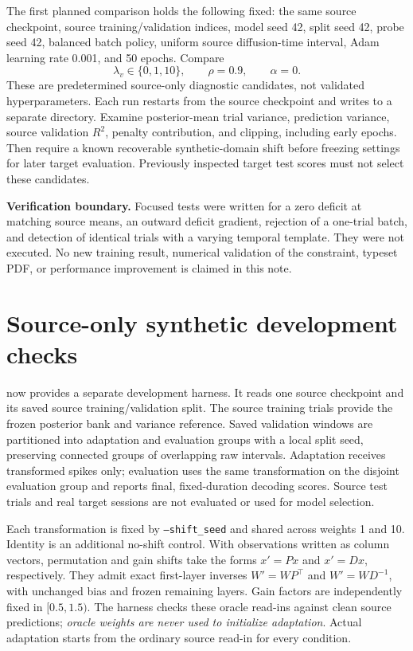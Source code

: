 \documentclass[11pt,a4paper]{article}
\begin{document}
The first planned comparison holds the following fixed: the same source
checkpoint, source training/validation indices, model seed 42, split seed 42,
probe seed 42, balanced batch policy, uniform source diffusion-time interval,
Adam learning rate 0.001, and 50 epochs. Compare
\begin{equation}
 \lambda_v\in\{0,1,10\},\qquad\rho=0.9,\qquad\alpha=0.
\end{equation}
These are predetermined source-only diagnostic candidates, not validated
hyperparameters. Each run restarts from the source checkpoint and writes to
a separate directory. Examine posterior-mean trial variance, prediction
variance, source validation $R^2$, penalty contribution, and clipping, including
early epochs. Then require a known recoverable synthetic-domain shift before
freezing settings for later target evaluation. Previously inspected target
test scores must not select these candidates.

\textbf{Verification boundary.} Focused tests were written for a zero deficit
at matching source means, an outward deficit gradient, rejection of a one-trial
batch, and detection of identical trials with a varying temporal template.
They were not executed. No new training result, numerical validation of the
constraint, typeset PDF, or performance improvement is claimed in this note.

\section{Source-only synthetic development checks}

 now provides a separate development harness.
It reads one source checkpoint and its saved source training/validation split.
The source training trials provide the frozen posterior bank and variance
reference. Saved validation windows are partitioned into adaptation and
evaluation groups with a local split seed, preserving connected groups of
overlapping raw intervals. Adaptation receives transformed spikes only;
evaluation uses the same transformation on the disjoint evaluation group and
reports final, fixed-duration decoding scores. Source test trials and real
target sessions are not evaluated or used for model selection.

Each transformation is fixed by \texttt{--shift\_seed} and shared across
weights 1 and 10. Identity is an additional no-shift control. With observations
written as column vectors, permutation and gain shifts take the forms
$x'=Px$ and $x'=Dx$, respectively. They admit exact first-layer inverses
$W'=WP^\top$ and $W'=WD^{-1}$, with unchanged bias and frozen remaining
layers. Gain factors are independently fixed in $[0.5,1.5)$.
The harness checks these oracle read-ins against clean source predictions;
\emph{oracle weights are never used to initialize adaptation}. Actual
adaptation starts from the ordinary source read-in for every condition.
\end{document}
